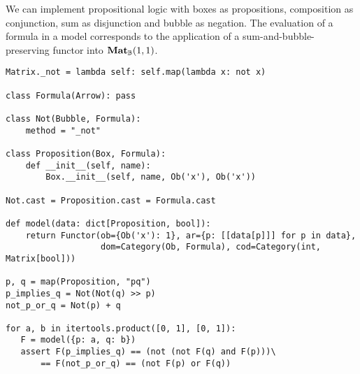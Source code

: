 \begin{example}\label{example:propositional-logic}
We can implement propositional logic with boxes as propositions, composition as conjunction, sum as disjunction and bubble as negation.
The evaluation of a formula in a model corresponds to the application of a sum-and-bubble-preserving functor into $\mathbf{Mat}_{\mathbb{B}}(1, 1)$.

\begin{verbatim}
Matrix._not = lambda self: self.map(lambda x: not x)

class Formula(Arrow): pass

class Not(Bubble, Formula):
    method = "_not"

class Proposition(Box, Formula):
    def __init__(self, name):
        Box.__init__(self, name, Ob('x'), Ob('x'))

Not.cast = Proposition.cast = Formula.cast

def model(data: dict[Proposition, bool]):
    return Functor(ob={Ob('x'): 1}, ar={p: [[data[p]]] for p in data},
                   dom=Category(Ob, Formula), cod=Category(int, Matrix[bool]))

p, q = map(Proposition, "pq")
p_implies_q = Not(Not(q) >> p)
not_p_or_q = Not(p) + q

for a, b in itertools.product([0, 1], [0, 1]):
   F = model({p: a, q: b})
   assert F(p_implies_q) == (not (not F(q) and F(p)))\
       == F(not_p_or_q) == (not F(p) or F(q))
\end{verbatim}
\end{example}

